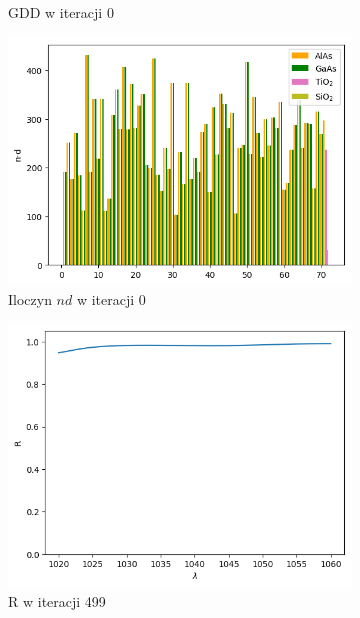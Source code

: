 \begin{figure} [H]
\begin{subfigure}[b]{0.31\textwidth}
        \caption{GDD w iteracji 0}
    \end{subfigure}
            \begin{subfigure}[b]{0.32\textwidth}
        \includegraphics[width=\linewidth]{figures/wyniki/1stopien/opt1000/result_ndresult0.png}
        \caption{Iloczyn $nd$ w iteracji 0}
    \end{subfigure}
        \begin{subfigure}[b]{0.30\textwidth}
        \includegraphics[width=\linewidth]{figures/wyniki/1stopien/opt1000/result_Rresult499.png}
        \caption{R w iteracji 499}
    \end{subfigure}
        \begin{subfigure}[b]{0.31\textwidth}

\end{subfigure}
\end{figure}
